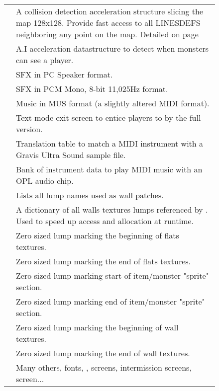 \begin{figure}[H]
\begin{tabularx}{\textwidth}{ L{0.2}  L{0.8}}
   & A collision detection acceleration structure slicing the map 128x128. Provide fast access to all LINESDEFS neighboring any point on the map. Detailed on page \pageref{blockmapdetails} \\
   &  A.I acceleration datastructure to detect when monsters can see a player.\\
  \toprule
   &  SFX in PC Speaker format.\\
   &  SFX in PCM Mono, 8-bit 11,025Hz format.\\
   & Music in MUS format (a slightly altered MIDI format).\\
  \toprule
   & Text-mode exit screen to entice players to by the full version. \\
   & Translation table to match a MIDI instrument with a Gravis Ultra Sound sample file.\\
   &  Bank of instrument data to play MIDI music with an OPL audio chip.\\
   &  Lists all lump names used as wall patches.\\
   &  A dictionary of all walls textures lumps referenced by . Used to speed up access and allocation at runtime.\\  
   &  Zero sized lump marking the beginning of flats textures.\\  
   &   Zero sized lump marking the end of flats textures.\\  
   & Zero sized lump marking start of item/monster "sprite" section. \\  
   & Zero sized lump marking end of item/monster "sprite" section. \\  
   & Zero sized lump marking the beginning of wall textures.\\
   & Zero sized lump marking the end of wall textures.\\
   &  Many others, fonts, ,  screens, intermission screens,  screen... \\  
   \toprule
\end{tabularx}
\end{figure}
\par
\pagebreak






